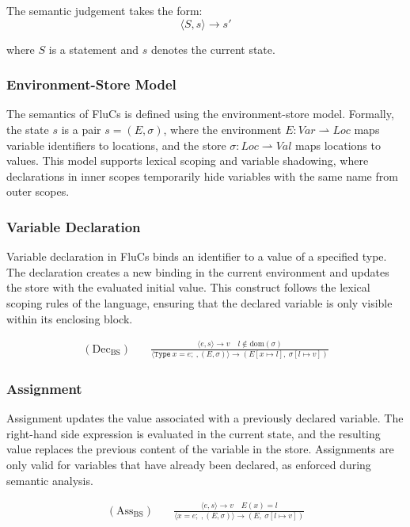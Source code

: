 The semantic judgement takes the form:
\[
\langle S, s \rangle \rightarrow s'
\]

where \( S \) is a statement and \( s \) denotes the current state.

\subsubsection{Environment-Store Model}

The semantics of FluCs is defined using the environment-store model. Formally, the state \( s \) is a pair \( s = (E, \sigma) \), where the environment \( E : \textit{Var} \rightharpoonup \textit{Loc} \) maps variable identifiers to locations, and the store \( \sigma : \textit{Loc} \rightharpoonup \textit{Val} \) maps locations to values. This model supports lexical scoping and variable shadowing, where declarations in inner scopes temporarily hide variables with the same name from outer scopes.

\subsubsection{Variable Declaration}
Variable declaration in FluCs binds an identifier to a value of a specified type. The declaration creates a new binding in the current environment and updates the store with the evaluated initial value. This construct follows the lexical scoping rules of the language, ensuring that the declared variable is only visible within its enclosing block.

\begin{align*}
(\text{Dec}_{\text{BS}}) \quad
&\frac{
  \langle e, s \rangle \rightarrow v \quad l \notin \text{dom}(\sigma)
}{
  \langle \texttt{Type}\ x = e;\ , (E, \sigma) \rangle \rightarrow (E[x \mapsto l],\ \sigma[l \mapsto v])
}
\end{align*}

\subsubsection{Assignment}
Assignment updates the value associated with a previously declared variable. The right-hand side expression is evaluated in the current state, and the resulting value replaces the previous content of the variable in the store. Assignments are only valid for variables that have already been declared, as enforced during semantic analysis.

\begin{align*}
(\text{Ass}_{\text{BS}}) \quad
&\frac{
  \langle e, s \rangle \rightarrow v \quad E(x) = l
}{
  \langle x = e;\ , (E, \sigma) \rangle \rightarrow (E,\ \sigma[l \mapsto v])
}
\end{align*}

